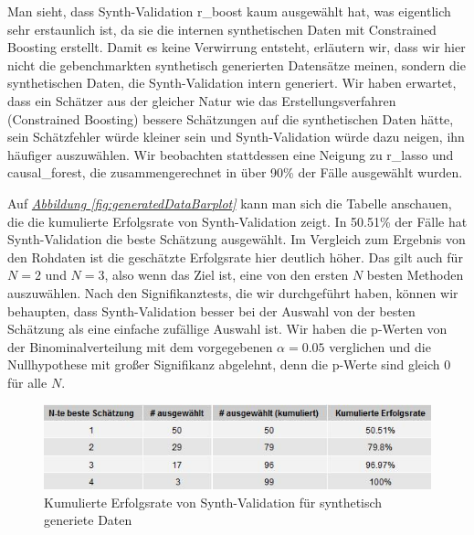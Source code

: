 \documentclass[12pt,a4paper,twoside]{scrartcl}
\numberwithin{equation}{section}
\newcommand{\reffig}[1]{\emph{\hyperref[#1]{Abbildung \ref*{#1}}}}
\begin{document}
\noindent
Man sieht, dass Synth-Validation r\_boost kaum ausgewählt hat, was eigentlich sehr erstaunlich ist, da sie die internen synthetischen Daten mit Constrained Boosting erstellt. Damit es keine Verwirrung entsteht, erläutern wir, dass wir hier nicht die gebenchmarkten synthetisch generierten Datensätze meinen, sondern die synthetischen  Daten, die Synth-Validation intern generiert. Wir haben erwartet, dass ein Schätzer aus der gleicher Natur wie das Erstellungsverfahren (Constrained Boosting) bessere Schätzungen auf die synthetischen Daten hätte, sein Schätzfehler würde kleiner sein und Synth-Validation würde dazu neigen, ihn häufiger auszuwählen. Wir beobachten stattdessen eine Neigung zu r\_lasso und causal\_forest, die zusammengerechnet in über 90\% der Fälle ausgewählt wurden.\par

\noindent
Auf \reffig{fig:generatedDataBarplot} kann man sich die Tabelle anschauen, die die kumulierte Erfolgsrate von Synth-Validation zeigt. In 50.51\% der Fälle hat Synth-Validation die beste Schätzung ausgewählt. Im Vergleich zum Ergebnis von den Rohdaten ist die geschätzte Erfolgsrate hier deutlich höher. Das gilt auch für $N=2$ und $N=3$, also wenn das Ziel ist, eine von den ersten $N$ besten Methoden auszuwählen. Nach den Signifikanztests, die wir durchgeführt haben, können wir behaupten, dass Synth-Validation besser bei der Auswahl von der besten Schätzung als eine einfache zufällige Auswahl ist. Wir haben die p-Werten von der Binominalverteilung mit dem vorgegebenen $\alpha = 0.05$ verglichen und die Nullhypothese mit großer Signifikanz abgelehnt, denn die p-Werte sind gleich 0 für alle $N$.

\begin{center}
\begin{figure}[h]
    \centering
    \includegraphics[height=0.2\textwidth, width=1\textwidth]{figures/plots/generatedDataGrid.jpeg}
    \caption[Kumulierte Erfolgsrate von Synth-Validation für synthetisch generiete Daten]{Kumulierte Erfolgsrate von Synth-Validation für synthetisch generiete Daten}\label{fig:generatedDataGrid}
  \end{figure}
\end{center}
\end{document}

